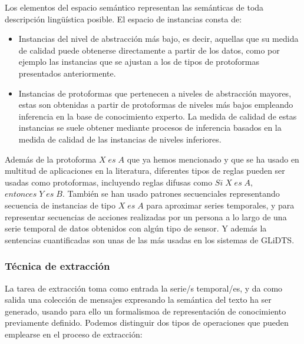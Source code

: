 \documentclass[10pt,a4paper]{article}
\begin{document}
Los elementos del espacio semántico representan las semánticas de toda descripción lingüística posible. El espacio de instancias consta de:

\begin{itemize}
\item Instancias del nivel de abstracción más bajo, es decir, aquellas que su medida de calidad puede obtenerse directamente a partir de los datos, como por ejemplo las instancias que se ajustan a los de tipos de protoformas presentados anteriormente.
\item Instancias de protoformas que pertenecen a niveles de abstracción mayores, estas son obtenidas a partir de protoformas de niveles más bajos empleando inferencia en la base de conocimiento experto. La medida de calidad de estas instancias se suele obtener mediante procesos de inferencia basados en la medida de calidad de las instancias de niveles inferiores.
\end{itemize}

Además de la protoforma $X \; es \; A$ que ya hemos mencionado y que se ha usado en multitud de aplicaciones en la literatura, diferentes tipos de reglas pueden ser usadas como protoformas, incluyendo reglas difusas como $Si \; X \; es \; A,$ $entonces \; Y \; es \; B$. También se han usado patrones secuenciales representando secuencia de instancias de tipo $X \; es \; A$ para aproximar series temporales, y para representar secuencias de acciones realizadas por un persona a lo largo de una serie temporal de datos obtenidos con algún tipo de sensor. Y además la sentencias cuantificadas son unas de las más usadas en los sistemas de GLiDTS.

\subsubsection{Técnica de extracción}

La tarea de extracción toma como entrada la serie/s temporal/es, y da como salida una colección de mensajes expresando la semántica del texto ha ser generado, usando para ello un formalismoa de representación de conocimiento previamente definido. Podemos distinguir dos tipos de operaciones que pueden emplearse en el proceso de extracción:
\end{document}
